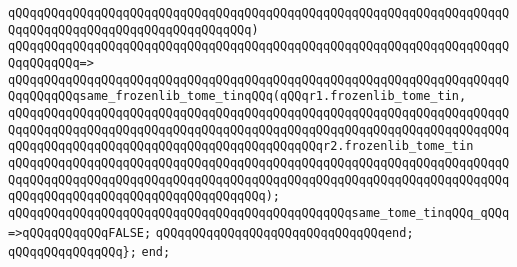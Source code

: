 \verb|qQQqqQQqqQQqqQQqqQQqqQQqqQQqqQQqqQQqqQQqqQQqqQQqqQQqqQQqqQQqqQQqqQQqqQQqqQQqqQQqqQQqqQQqqQQqqQQqqQQqqQQq)|\newline
\verb|qQQqqQQqqQQqqQQqqQQqqQQqqQQqqQQqqQQqqQQqqQQqqQQqqQQqqQQqqQQqqQQqqQQqqQQqqQQqqQQq=>|\newline
\verb|qQQqqQQqqQQqqQQqqQQqqQQqqQQqqQQqqQQqqQQqqQQqqQQqqQQqqQQqqQQqqQQqqQQqqQQqqQQqqQQqsame_frozenlib_tome_tinqQQq(qQQqr1.frozenlib_tome_tin,|\newline
\verb|qQQqqQQqqQQqqQQqqQQqqQQqqQQqqQQqqQQqqQQqqQQqqQQqqQQqqQQqqQQqqQQqqQQqqQQqqQQqqQQqqQQqqQQqqQQqqQQqqQQqqQQqqQQqqQQqqQQqqQQqqQQqqQQqqQQqqQQqqQQqqQQqqQQqqQQqqQQqqQQqqQQqqQQqqQQqqQQqqQQqqQQqr2.frozenlib_tome_tin|\newline
\verb|qQQqqQQqqQQqqQQqqQQqqQQqqQQqqQQqqQQqqQQqqQQqqQQqqQQqqQQqqQQqqQQqqQQqqQQqqQQqqQQqqQQqqQQqqQQqqQQqqQQqqQQqqQQqqQQqqQQqqQQqqQQqqQQqqQQqqQQqqQQqqQQqqQQqqQQqqQQqqQQqqQQqqQQqqQQqqQQq);|\newline
\newline
\verb|qQQqqQQqqQQqqQQqqQQqqQQqqQQqqQQqqQQqqQQqqQQqqQQqsame_tome_tinqQQq_qQQq=>qQQqqQQqqQQqFALSE;|\newline
\verb|qQQqqQQqqQQqqQQqqQQqqQQqqQQqqQQqend;|\newline
\verb|qQQqqQQqqQQqqQQq};|\newline
\verb|end;|\newline
\newline
\newline
\newline
\newline

